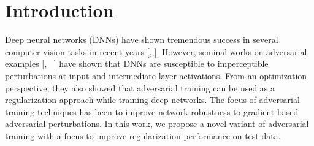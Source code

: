 \section{Introduction}\label{sec:intro}
Deep neural networks (DNNs) have shown tremendous success in several computer vision tasks in recent years [\cite{resnet},\cite{schroff2015facenet},\cite{krizhevsky2012imagenet}]. However, seminal works on adversarial examples [\cite{goodfellow2014explaining}, ~\cite{szegedy2013intriguing}] have shown that DNNs are susceptible to imperceptible perturbations at input and intermediate layer activations. From an optimization perspective, they also showed that adversarial training can be used as a regularization approach while training deep networks.  The focus of adversarial training techniques has been to improve network robustness to gradient based adversarial perturbations. In this work, we propose a novel variant of adversarial training with a focus to improve regularization performance on test data.





